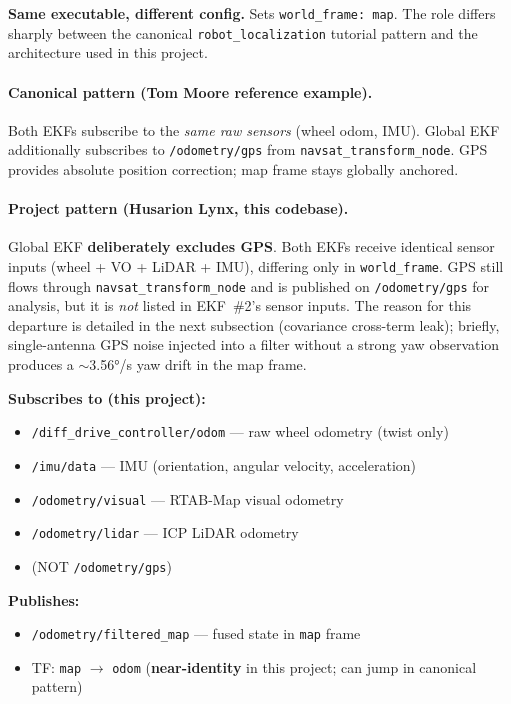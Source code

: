 \documentclass[11pt,a4paper]{article}
\begin{document}
\textbf{Same executable, different config.} Sets \texttt{world\_frame: map}. The role differs sharply between the canonical \texttt{robot\_localization} tutorial pattern and the architecture used in this project.

\paragraph{Canonical pattern (Tom Moore reference example).}
Both EKFs subscribe to the \emph{same raw sensors} (wheel odom, IMU). Global EKF additionally subscribes to \texttt{/odometry/gps} from \texttt{navsat\_transform\_node}. GPS provides absolute position correction; map frame stays globally anchored.

\paragraph{Project pattern (Husarion Lynx, this codebase).}
Global EKF \textbf{deliberately excludes GPS}. Both EKFs receive identical sensor inputs (wheel + VO + LiDAR + IMU), differing only in \texttt{world\_frame}. GPS still flows through \texttt{navsat\_transform\_node} and is published on \texttt{/odometry/gps} for analysis, but it is \emph{not} listed in EKF~\#2's sensor inputs. The reason for this departure is detailed in the next subsection (covariance cross-term leak); briefly, single-antenna GPS noise injected into a filter without a strong yaw observation produces a $\sim$3.56°/s yaw drift in the map frame.

\textbf{Subscribes to (this project):}
\begin{itemize}
\item \texttt{/diff\_drive\_controller/odom} --- raw wheel odometry (twist only)
\item \texttt{/imu/data} --- IMU (orientation, angular velocity, acceleration)
\item \texttt{/odometry/visual} --- RTAB-Map visual odometry
\item \texttt{/odometry/lidar} --- ICP LiDAR odometry
\item (NOT \texttt{/odometry/gps})
\end{itemize}

\textbf{Publishes:}
\begin{itemize}
\item \texttt{/odometry/filtered\_map} --- fused state in \texttt{map} frame
\item TF: \texttt{map} $\to$ \texttt{odom} (\textbf{near-identity} in this project; can jump in canonical pattern)
\end{itemize}
\end{document}
